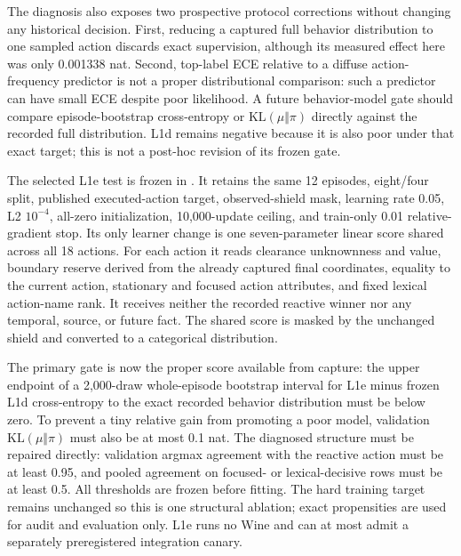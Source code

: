 \documentclass[11pt]{article}
\begin{document}
The diagnosis also exposes two prospective protocol corrections without
changing any historical decision.  First, reducing a captured full behavior
distribution to one sampled action discards exact supervision, although its
measured effect here was only 0.001338 nat.  Second, top-label ECE relative to
a diffuse action-frequency predictor is not a proper distributional comparison:
such a predictor can have small ECE despite poor likelihood.  A future
behavior-model gate should compare episode-bootstrap cross-entropy or
$\mathrm{KL}(\mu\Vert\pi)$ directly against the recorded full distribution.
L1d remains negative because it is also poor under that exact target; this is
not a post-hoc revision of its frozen gate.

The selected L1e test is frozen in
.  It retains the same
12 episodes, eight/four split, published executed-action target, observed-shield
mask, learning rate 0.05, L2 $10^{-4}$, all-zero initialization, 10,000-update
ceiling, and train-only 0.01 relative-gradient stop.  Its only learner change
is one seven-parameter linear score shared across all 18 actions.  For each
action it reads clearance unknownness and value, boundary reserve derived from
the already captured final coordinates, equality to the current action,
stationary and focused action attributes, and fixed lexical action-name rank.
It receives neither the recorded reactive winner nor any temporal, source, or
future fact.  The shared score is masked by the unchanged shield and converted
to a categorical distribution.

The primary gate is now the proper score available from capture: the upper
endpoint of a 2,000-draw whole-episode bootstrap interval for L1e minus frozen
L1d cross-entropy to the exact recorded behavior distribution must be below
zero.  To prevent a tiny relative gain from promoting a poor model, validation
$\mathrm{KL}(\mu\Vert\pi)$ must also be at most 0.1 nat.  The diagnosed
structure must be repaired directly: validation argmax agreement with the
reactive action must be at least 0.95, and pooled agreement on focused- or
lexical-decisive rows must be at least 0.5.  All thresholds are frozen before
fitting.  The hard training target remains unchanged so this is one structural
ablation; exact propensities are used for audit and evaluation only.  L1e runs
no Wine and can at most admit a separately preregistered integration canary.
\end{document}
